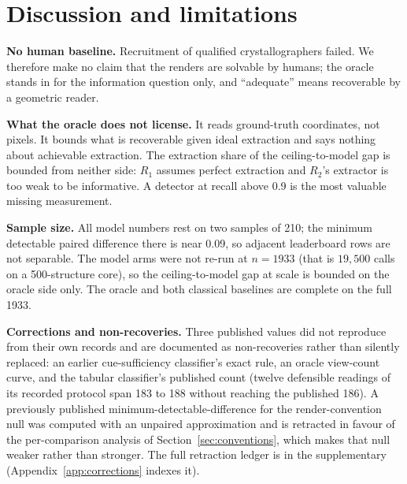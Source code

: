 \section{Discussion and limitations}
\label{sec:discussion}

\textbf{No human baseline.} Recruitment of qualified crystallographers failed. We therefore make no claim
that the renders are solvable by humans; the oracle stands in for the information question only, and
``adequate'' means recoverable by a geometric reader.

\textbf{What the oracle does not license.} It reads ground-truth coordinates, not pixels. It bounds what is
recoverable given ideal extraction and says nothing about achievable extraction. The extraction share of
the ceiling-to-model gap is bounded from neither side: $R_1$ assumes perfect extraction and $R_2$'s
extractor is too weak to be informative. A detector at recall above 0.9 is the most valuable missing
measurement.

\textbf{Sample size.} All model numbers rest on two samples of 210; the minimum detectable paired
difference there is near 0.09, so adjacent leaderboard rows are not separable. The model arms were not
re-run at $n = 1933$ (that is $19{,}500$ calls on a 500-structure core), so the ceiling-to-model gap at
scale is bounded on the oracle side only. The oracle and both classical baselines are complete on the full
1933.

\textbf{Corrections and non-recoveries.} Three published values did not reproduce from their own records
and are documented as non-recoveries rather than silently replaced: an earlier cue-sufficiency classifier's
exact rule, an oracle view-count curve, and the tabular classifier's published count (twelve defensible
readings of its recorded protocol span 183 to 188 without reaching the published 186). A previously
published minimum-detectable-difference for the render-convention null was computed with an unpaired
approximation and is retracted in favour of the per-comparison analysis of Section~\ref{sec:conventions},
which makes that null weaker rather than stronger. The full retraction ledger is in the supplementary
(Appendix~\ref{app:corrections} indexes it).

